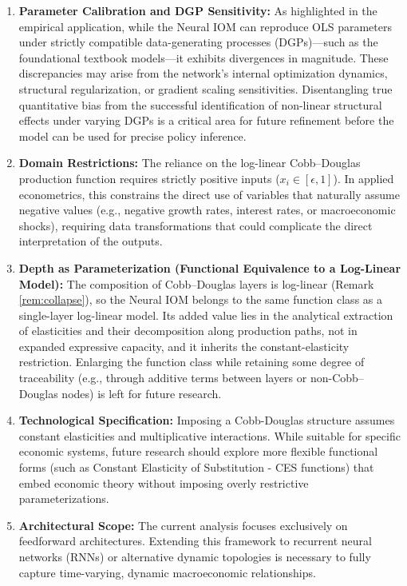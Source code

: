\documentclass[preprint,12pt,authoryear]{sn-jnl}
\begin{document}
\begin{enumerate}
    \item \textbf{Parameter Calibration and DGP Sensitivity:} As highlighted in the empirical application, while the Neural IOM can reproduce OLS parameters under strictly compatible data-generating processes (DGPs)—such as the foundational textbook models—it exhibits divergences in magnitude. These discrepancies may arise from the network's internal optimization dynamics, structural regularization, or gradient scaling sensitivities.  Disentangling true quantitative bias from the successful identification of non-linear structural effects under varying DGPs is a critical area for future refinement before the model can be used for precise policy inference.
    \item \textbf{Domain Restrictions:} The reliance on the log-linear Cobb–Douglas production function requires strictly positive inputs ($x_i \in [\epsilon, 1]$). In applied econometrics, this constrains the direct use of variables that naturally assume negative values (e.g., negative growth rates, interest rates, or macroeconomic shocks), requiring data transformations that could complicate the direct interpretation of the outputs.
    \item \textbf{Depth as Parameterization (Functional Equivalence to a Log-Linear Model):} The composition of Cobb--Douglas layers is log-linear (Remark \ref{rem:collapse}), so the Neural IOM belongs to the same function class as a single-layer log-linear model. Its added value lies in the analytical extraction of elasticities and their decomposition along production paths, not in expanded expressive capacity, and it inherits the constant-elasticity restriction. Enlarging the function class while retaining some degree of traceability (e.g., through additive terms between layers or non-Cobb--Douglas nodes) is left for future research.
    \item \textbf{Technological Specification:} Imposing a Cobb-Douglas structure assumes constant elasticities and multiplicative interactions. While suitable for specific economic systems, future research should explore more flexible functional forms (such as Constant Elasticity of Substitution - CES functions) that embed economic theory without imposing overly restrictive parameterizations.
    \item \textbf{Architectural Scope:} The current analysis focuses exclusively on feedforward architectures. Extending this framework to recurrent neural networks (RNNs) or alternative dynamic topologies is necessary to fully capture time-varying, dynamic macroeconomic relationships.
\end{enumerate}
\end{document}

